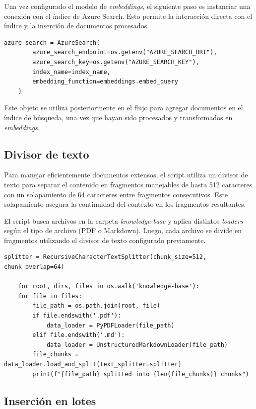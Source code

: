Una vez configurado el modelo de \textit{embeddings}, el siguiente paso es instanciar una conexión con el índice de Azure Search. 
Esto permite la interacción directa con el índice y la inserción de documentos procesados.

\begin{lstlisting}[label=cod:update-db-4,caption=Conexión con la base de datos.]
	azure_search = AzureSearch(
		azure_search_endpoint=os.getenv("AZURE_SEARCH_URI"),
		azure_search_key=os.getenv("AZURE_SEARCH_KEY"),
		index_name=index_name,
		embedding_function=embeddings.embed_query
	)
\end{lstlisting}

Este objeto se utiliza posteriormente en el flujo para agregar documentos en el índice de búsqueda, una vez que hayan sido procesados y transformados en \textit{embeddings}.

\subsection{Divisor de texto}

Para manejar eficientemente documentos extensos, el script utiliza un divisor de texto para separar el contenido en fragmentos manejables 
de hasta 512 caracteres con un solapamiento de 64 caracteres entre fragmentos consecutivos. Este solapamiento asegura la continuidad del
contexto en los fragmentos resultantes.

El script busca archivos en la carpeta \textit{knowledge-base} y aplica distintos \textit{loaders} según el tipo de archivo (PDF o Markdown). Luego, 
cada archivo se divide en fragmentos utilizando el divisor de texto configurado previamente.

\begin{lstlisting}[label=cod:update-db-5,caption=Divisor de texto.]
	splitter = RecursiveCharacterTextSplitter(chunk_size=512, chunk_overlap=64)

	for root, dirs, files in os.walk('knowledge-base'):
    for file in files:
        file_path = os.path.join(root, file)
        if file.endswith('.pdf'):
            data_loader = PyPDFLoader(file_path)
        elif file.endswith('.md'):
            data_loader = UnstructuredMarkdownLoader(file_path)
        file_chunks = data_loader.load_and_split(text_splitter=splitter)
        print(f"{file_path} splitted into {len(file_chunks)} chunks")
\end{lstlisting}

\subsection{Inserción en lotes}

